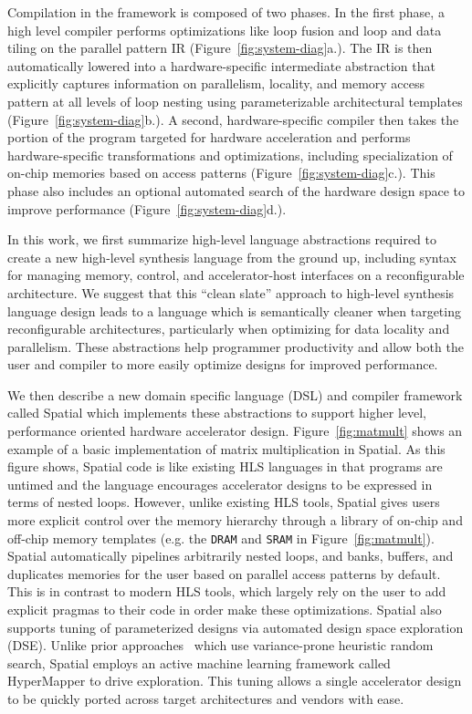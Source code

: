 Compilation in the framework is composed of two phases. In the first phase,
a high level compiler performs optimizations like loop fusion and loop and
data tiling on the parallel pattern IR (Figure~\ref{fig:system-diag}a.).
The IR is then automatically lowered into a hardware-specific intermediate
abstraction that explicitly captures information on parallelism,
locality, and memory access pattern at all levels of loop nesting using
parameterizable architectural templates (Figure~\ref{fig:system-diag}b.).
A second, hardware-specific compiler then takes the portion of the program
targeted for hardware acceleration and performs hardware-specific transformations and
optimizations, including specialization of on-chip memories based on access patterns (Figure~\ref{fig:system-diag}c.).
This phase also includes an optional automated search of the hardware design space
to improve performance (Figure~\ref{fig:system-diag}d.).

In this work, we first summarize high-level language abstractions required to create a new high-level synthesis language from the ground up, including syntax for managing memory, control, and accelerator-host interfaces on a reconfigurable architecture.
We suggest that this ``clean slate'' approach to high-level synthesis language design leads to a language which is semantically cleaner when targeting reconfigurable architectures, particularly when optimizing for data locality and parallelism.
These abstractions help programmer productivity and allow both the user and compiler to more easily optimize designs for improved performance.


We then describe a new domain specific language (DSL) and compiler framework called Spatial which implements these abstractions to support higher level, performance oriented hardware accelerator design.
Figure~\ref{fig:matmult} shows an example of a basic implementation of matrix multiplication in Spatial.
As this figure shows, Spatial code is like existing HLS languages in that programs are untimed and the language encourages accelerator designs to be expressed in terms of nested loops. However, unlike existing HLS tools, Spatial gives users more explicit control over the memory hierarchy through a library of on-chip and off-chip memory templates (e.g. the \texttt{DRAM} and \texttt{SRAM} in Figure~\ref{fig:matmult}).
Spatial automatically pipelines arbitrarily nested loops, and banks, buffers, and duplicates memories for the user based on parallel access patterns by default.
This is in contrast to modern HLS tools, which largely rely on the user to add explicit pragmas to their code in order make these optimizations.
Spatial also supports tuning of parameterized designs via automated design space exploration (DSE).
Unlike prior approaches~\cite{dhdl} which use variance-prone heuristic random search, Spatial employs an active machine learning framework called HyperMapper \cite{Bodin2016:PACT16} to drive exploration.
This tuning allows a single accelerator design to be quickly ported across target architectures and vendors with ease.


